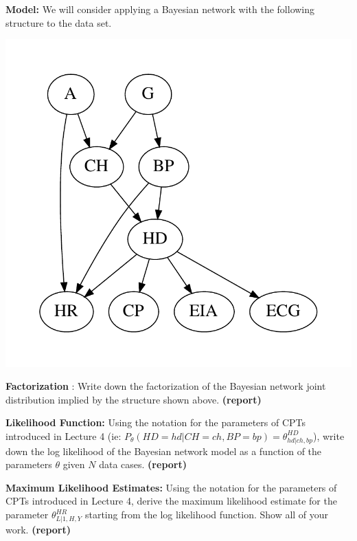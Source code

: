 \documentclass[11pt]{article}
\begin{document}
\textbf{Model: } We will consider applying a Bayesian network
with the following structure to the data set.\\

\begin{center}
    \includegraphics[scale=0.5,trim=10mm 10mm 10mm 10mm,clip]{bn.pdf}
\end{center}

\begin{problem}{10} \textbf{Factorization }:  Write down the factorization of the Bayesian network joint distribution implied by the structure shown above. \textbf{(report)}
\end{problem}

\begin{problem}{10} \textbf{Likelihood Function:} Using the notation for the parameters of CPTs introduced in Lecture 4 (ie: $P_{\theta}(HD=hd|CH=ch,BP=bp)=\theta^{HD}_{hd|ch,bp}$), write down the log likelihood of the Bayesian network model as a function of the parameters $\theta$ given $N$ data cases. \textbf{(report)}
\end{problem}

\begin{problem}{10} \textbf{Maximum Likelihood Estimates: } Using the notation for the parameters of CPTs introduced in Lecture 4, derive the maximum likelihood estimate for the parameter $\theta^{HR}_{L|1,H,Y}$ starting from the log likelihood function. Show all of your work. \textbf{(report)}
\end{problem}
\end{document}
